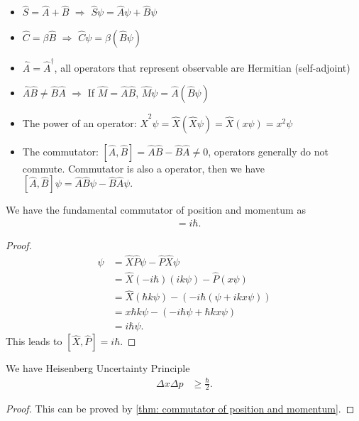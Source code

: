 \documentclass[../../note.tex]{subfiles}
\begin{document}
\begin{property}
\begin{itemize}
  \item $\hat{S} = \hat{A} + \hat{B}$ $\Longrightarrow$ $\hat{S} \psi = \hat{A} \psi + \hat{B} \psi$ 
  \item $\hat{C} = \beta \hat{B}$ $\Longrightarrow$ $\hat{C} \psi = \beta (\hat{B} \psi)$
  \item $\hat{A} = \hat{A}^\dagger$, all operators that represent observable are Hermitian (self-adjoint)
  \item $\hat{A} \hat{B} \neq \hat{B} \hat{A}$ $\Longrightarrow$ If $\hat{M} = \hat{A} \hat{B}$, $\hat{M} \psi = \hat{A} (\hat{B} \psi)$
  \item The power of an operator: $\hat{X}^2\psi = \hat{X} (\hat{X} \psi) = \hat{X}(x \psi) = x^2 \psi$
  \item The commutator: $[\hat{A}, \hat{B}] = \hat{A} \hat{B} - \hat{B} \hat{A} \neq 0$, operators generally do not commute. Commutator is also a operator, then we have $[\hat{A}, \hat{B}]\psi = \hat{A} \hat{B} \psi - \hat{B} \hat{A} \psi$.
\end{itemize}
\end{property}

\begin{theorem}
  \label{thm: commutator of position and momentum}
  We have the fundamental commutator of position and momentum as
  \begin{align}
    [\hat{X}, \hat{P}]
    &= i \hbar.
  \end{align}
\end{theorem}
\begin{proof}
  \begin{align}
    [\hat{X}, \hat{P}] \psi
    &= \hat{X}\hat{P} \psi - \hat{P} \hat{X} \psi \\
    &= \hat{X} (-i \hbar)(i k \psi) - \hat{P} (x \psi) \\
    &= \hat{X} (\hbar k \psi) - (-i \hbar (\psi + i k x \psi)) \\
    &= x \hbar k \psi - (- i \hbar \psi + \hbar k x \psi) \\
    &= i \hbar \psi.
  \end{align}
  This leads to $[\hat{X}, \hat{P}] = i \hbar$.
\end{proof}

\begin{corollary}
  We have Heisenberg Uncertainty Principle
  \begin{align}
    \Delta x \Delta p
    &\geq \frac{\hbar}{2}.
  \end{align}
\end{corollary}
\begin{proof}
  This can be proved by \ref{thm: commutator of position and momentum}.
\end{proof}
\end{document}
